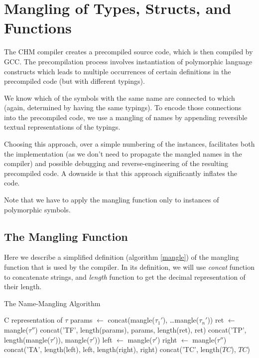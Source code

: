 \chapter{Mangling of Types, Structs, and Functions}

The CHM compiler creates a precompiled source code, which is then compiled by GCC. The precompilation process involves instantiation of polymorphic language constructs which leads to multiple occurrences of certain definitions in the precompiled code (but with different typings).

We know which of the symbols with the same name are connected to which (again, determined by having the same typings). To encode those connections into the precompiled code, we use a mangling of names by appending reversible textual representations of the typings.

Choosing this approach, over a simple numbering of the instances, facilitates both the implementation (as we don't need to propagate the mangled names in the compiler) and possible debugging and reverse-engineering of the resulting precompiled code. A downside is that this approach significantly inflates the code.

Note that we have to apply the mangling function only to instances of polymorphic symbols.

\section{The Mangling Function}

Here we describe a simplified definition (algorithm \ref{mangle}) of the mangling function that is used by the compiler. In its definition, we will use \emph{concat} function to concatenate strings, and \emph{length} function to get the decimal representation of their length.

\begin{algorithm}
\caption{The Name-Mangling Algorithm}
\label{mangle}
\begin{algorithmic}[1]
     \Return C representation of $\tau$
        \State params $\gets$ concat(mangle($\tau_1'$), \dots mangle($\tau_n'$))
        \State ret $\gets$ mangle($\tau''$)
        \State \Return concat('TF', length(params), params, length(ret), ret)
        \State \Return concat('TP', length(mangle($\tau'$)), mangle($\tau'$))
        \State left $\gets$ mangle($\tau'$)
        \State right $\gets$ mangle($\tau''$)
        \State \Return concat('TA', length(left), left, length(right), right)
        \State \Return concat('TC', length($TC$), $TC$)
    \EndIf
\EndFunction
\end{algorithmic}
\end{algorithm}
